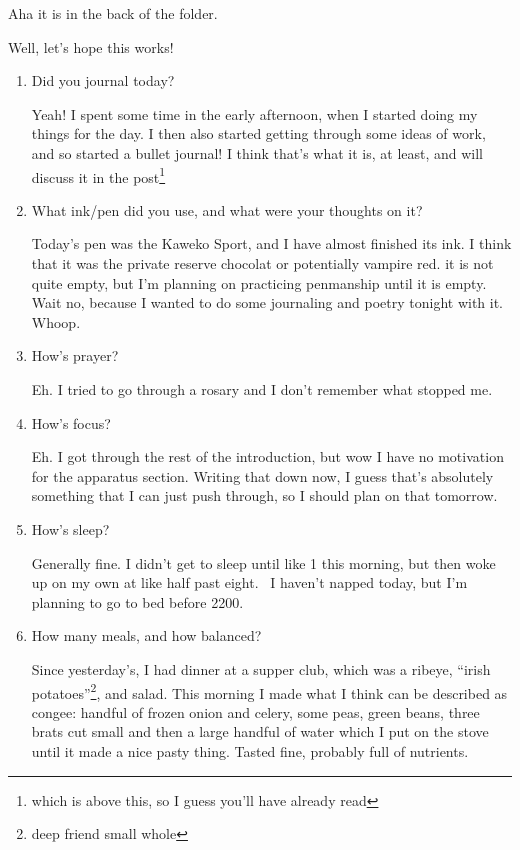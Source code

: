 \documentclass[12pt]{article}
\newcommand{\say}[1]{``#1''}
\renewcommand{\,}{\textsuperscript{,}}
\begin{document}
Aha it is in the back of the folder.

Well, let's hope this works!

\begin{enumerate}

\item Did you journal today?

Yeah! I spent some time in the early afternoon, when I started doing my things for the day.  
I then also started getting through some ideas of work, and so started a bullet journal! I think that's what it is, at least, and will discuss it in the post\footnote{which is above this, so I guess you'll have already read}

\item What ink/pen did you use, and what were your thoughts on it?

Today's pen was the Kaweko Sport, and I have almost finished its ink. I think that it was the private reserve chocolat or potentially vampire red. it is not quite empty, but I'm planning on practicing penmanship until it is empty. Wait no, because I wanted to do some journaling and poetry tonight with it. Whoop.

\item How's prayer?

Eh. I tried to go through a rosary and I don't remember what stopped me.

\item How's focus?

Eh. I got through the rest of the introduction, but wow I have no motivation for the apparatus section. Writing that down now, I guess that's absolutely something that I can just push through, so I should plan on that tomorrow.

\item How's sleep?

Generally fine. I didn't get to sleep until like 1 this morning, but then woke up on my own at like half past eight.   
I haven't napped today, but I'm planning to go to bed before 2200.

\item How many meals, and how balanced?

Since yesterday's, I had dinner at a supper club, which was a ribeye, \say{irish potatoes}\footnote{deep friend small whole}, and salad.  
This morning I made what I think can be described as congee: handful of frozen onion and celery, some peas, green beans, three brats cut small and then a large handful of water which I put on the stove until it made a nice pasty thing.  
Tasted fine, probably full of nutrients.


\end{enumerate}
\end{document}
